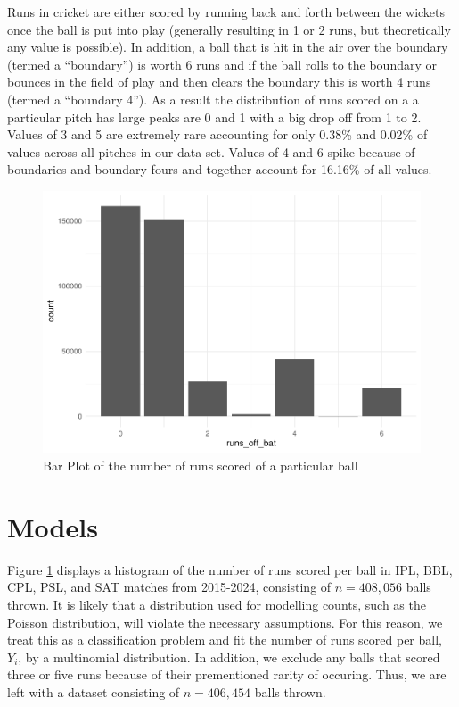 \documentclass[
  12pt,
]{article}
\begin{document}
Runs in cricket are either scored by running back and forth between the
wickets once the ball is put into play (generally resulting in 1 or 2
runs, but theoretically any value is possible). In addition, a ball that
is hit in the air over the boundary (termed a ``boundary'') is worth 6
runs and if the ball rolls to the boundary or bounces in the field of
play and then clears the boundary this is worth 4 runs (termed a
``boundary 4''). As a result the distribution of runs scored on a a
particular pitch has large peaks are 0 and 1 with a big drop off from 1
to 2. Values of 3 and 5 are extremely rare accounting for only 0.38\%
and 0.02\% of values across all pitches in our data set. Values of 4 and
6 spike because of boundaries and boundary fours and together account
for 16.16\% of all values.

\begin{figure}

{\centering \includegraphics{paper_files/figure-latex/bar-1} 

}

\caption{Bar Plot of the number of runs scored of a particular ball}\label{fig:bar}
\end{figure}

\hypertarget{sec:models}{%
\section{Models}\label{sec:models}}

Figure \ref{fig:bar} displays a histogram of the number of runs scored
per ball in IPL, BBL, CPL, PSL, and SAT matches from 2015-2024,
consisting of \(n = 408,056\) balls thrown. It is likely that a
distribution used for modelling counts, such as the Poisson
distribution, will violate the necessary assumptions. For this reason,
we treat this as a classification problem and fit the number of runs
scored per ball, \(Y_i\), by a multinomial distribution. In addition, we
exclude any balls that scored three or five runs because of their
prementioned rarity of occuring. Thus, we are left with a dataset
consisting of \(n = 406,454\) balls thrown.
\end{document}
